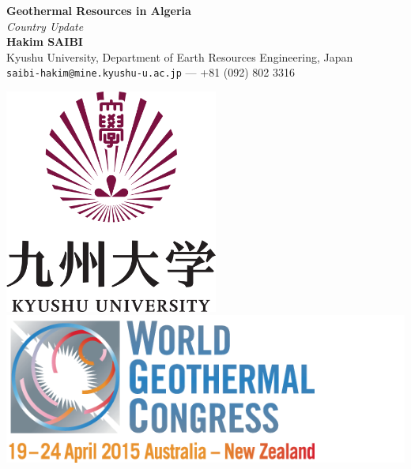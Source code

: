 \documentclass[a0,portrait]{a0poster}
\begin{document}


\begin{minipage}[b]{0.75\linewidth}
\VeryHuge \color{NavyBlue} \textbf{Geothermal Resources in Algeria} \color{Black}\\ %
\Huge\textit{Country Update}\\[2.4cm] %
\huge \textbf{Hakim SAIBI}\\[0.5cm] %
\huge Kyushu University, Department of Earth Resources Engineering, Japan\\[0.4cm] %
\Large \texttt{saibi-hakim@mine.kyushu-u.ac.jp} --- +81 (092) 802 3316\\
\end{minipage}
%
\begin{minipage}[b]{0.25\linewidth}
\includegraphics[width=7cm]{logo.png}\ 
\includegraphics[width=14cm]{logo-WGC.png}\\
\end{minipage}
\end{document}
